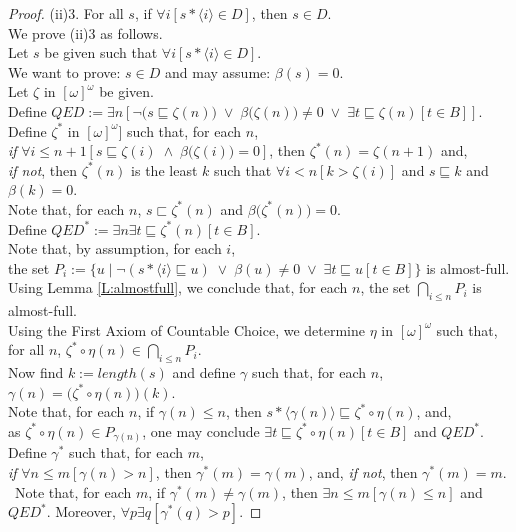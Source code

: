 \documentclass[a4paper]{amsart}
\theoremstyle{plain}
\begin{document}
\begin{proof}
(ii)3. For all $s$, if $\forall i[s\ast\langle i \rangle \in D]$, then $s \in D$. \\We prove (ii)3  as follows. \\Let $s$ be given such that $\forall i[s\ast\langle i\rangle \in D]$. \\We want to prove: $s \in D$ and may assume: $\beta(s)=0$. 
  \\Let $\zeta$ in $[\omega]^\omega$ be given. \\Define $QED:=\exists n[\neg\bigl(s\sqsubseteq \zeta(n)\bigr)\;\vee\;\beta\bigl(\zeta(n)\bigr)\neq 0\;\vee\;\exists t\sqsubseteq \zeta(n)[t\in B]]$. \\Define $\zeta^\ast$ in $[\omega]^\omega]$ such that, for each $n$, \\{\it if} $\forall i\le n +1 [s\sqsubseteq \zeta(i) \;\wedge\;\beta\bigl(\zeta(i)\bigr)=0]$, then $\zeta^\ast(n)=\zeta(n+1)$ and, \\{\it if not}, then $\zeta^\ast(n)$ is the least $k$ such that $\forall i<n[k>\zeta(i)]$ and $s\sqsubseteq k$ and $\beta(k)=0$.
 \\Note that, for each $n$, $s\sqsubset \zeta^\ast (n)$ and $\beta\bigl(\zeta^\ast(n)\bigr)=0$. \\Define $QED^\ast:= \exists n\exists t\sqsubseteq \zeta^\ast(n)[t\in B]$.
  \\ Note that, by assumption, for each $i$, \\the set $P_i:=\{u\mid\neg( s\ast \langle i \rangle \sqsubseteq u) \;\vee\;\beta(u)\neq 0\;\vee\; \exists t\sqsubseteq u[t\in B] \}$ is almost-full. 
 \\Using Lemma \ref{L:almostfull}, we conclude that, for each $n$, the set $\bigcap_{i\le n}P_i$ is almost-full. \\Using the First Axiom of Countable Choice, we  determine $\eta$ in $[\omega]^\omega$  such that, \\for all $n$, $\zeta^\ast\circ\eta(n)\in \bigcap_{i\le n} P_i$. 
 \\Now find $k:=length(s)$ and define  $\gamma$ such that, for each $n$,  $\gamma(n)=\bigl(\zeta^\ast\circ\eta(n)\bigr)(k)$.  
 \\Note that, for each $n$, if  $\gamma(n) \le n$, then $s\ast \langle \gamma(n)\rangle \sqsubseteq \zeta^\ast\circ\eta (n)$, and, \\as $\zeta^\ast\circ\eta(n) \in P_{\gamma(n)}$, one may conclude $\exists t\sqsubseteq \zeta^\ast\circ\eta(n)[t\in B]$ and $QED^\ast$.
\\Define $\gamma^\ast$ such that, for each $m$, \\{\it if } $\forall n\le m[\gamma(n)> n]$, then $\gamma^\ast (m)=\gamma(m)$, and, {\it if not}, then $\gamma^\ast(m)=m$. \\\ Note that, for each $m$, if $\gamma^\ast(m)\neq \gamma(m)$, then $\exists n\le m[\gamma(n)\le n]$ and $QED^\ast$.  Moreover, $\forall p\exists q[\gamma^\ast(q)>p]$. 

\end{proof}
\end{document}
